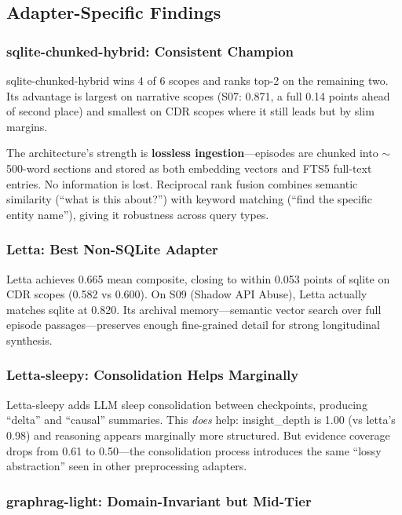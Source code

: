\documentclass[11pt,letterpaper]{article}
\begin{document}
\subsection{Adapter-Specific Findings}

\subsubsection{sqlite-chunked-hybrid: Consistent Champion}

sqlite-chunked-hybrid wins 4 of 6 scopes and ranks top-2 on the remaining two. Its advantage is largest on narrative scopes (S07: 0.871, a full 0.14 points ahead of second place) and smallest on CDR scopes where it still leads but by slim margins.

The architecture's strength is \textbf{lossless ingestion}---episodes are chunked into $\sim$500-word sections and stored as both embedding vectors and FTS5 full-text entries. No information is lost. Reciprocal rank fusion combines semantic similarity (``what is this about?'') with keyword matching (``find the specific entity name''), giving it robustness across query types.

\subsubsection{Letta: Best Non-SQLite Adapter}

Letta achieves 0.665 mean composite, closing to within 0.053 points of sqlite on CDR scopes (0.582 vs 0.600). On S09 (Shadow API Abuse), Letta actually matches sqlite at 0.820. Its archival memory---semantic vector search over full episode passages---preserves enough fine-grained detail for strong longitudinal synthesis.

\subsubsection{Letta-sleepy: Consolidation Helps Marginally}

Letta-sleepy adds LLM sleep consolidation between checkpoints, producing ``delta'' and ``causal'' summaries. This \emph{does} help: insight\_depth is 1.00 (vs letta's 0.98) and reasoning appears marginally more structured. But evidence coverage drops from 0.61 to 0.50---the consolidation process introduces the same ``lossy abstraction'' seen in other preprocessing adapters.

\subsubsection{graphrag-light: Domain-Invariant but Mid-Tier}
\end{document}
